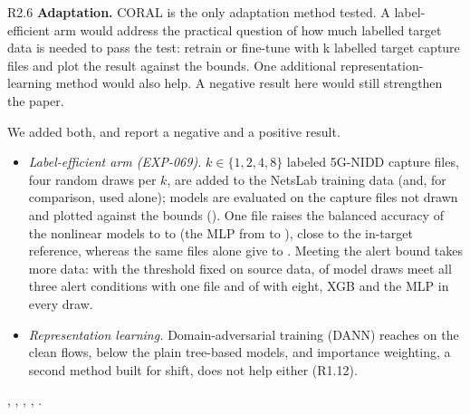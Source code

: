 \label{rv:R2.6}
\begin{concern}{R2.6}
\textbf{Adaptation.} CORAL is the only adaptation method tested. A label-efficient arm would address the practical question of how much labelled target data is needed to pass the test: retrain or fine-tune with k labelled target capture files and plot the result against the bounds. One additional representation-learning method would also help. A negative result here would still strengthen the paper.
\end{concern}
\response We added both, and report a negative and a positive result.
\begin{itemize}[leftmargin=*, itemsep=1pt]
\item \emph{Label-efficient arm (EXP-069).} $k \in \{1, 2, 4, 8\}$ labeled 5G-NIDD capture files, four random draws per $k$, are added to the NetsLab training data (and, for comparison, used alone); models are evaluated on the capture files not drawn and plotted against the bounds (). One file raises the balanced accuracy of the nonlinear models to \RLeSrcOneNlMin{} to \RLeSrcOneNlMax{} (the MLP from \RLeZeroMLP{} to \RLeSrcOneMLP), close to the in-target reference, whereas the same files alone give \RLeTgtOneNlMin{} to \RLeTgtOneNlMax. Meeting the alert bound takes more data: with the threshold fixed on source data, \RLeSrcOneMeet{} of \RLeSrcOneCells{} model draws meet all three alert conditions with one file and \RLeSrcEightMeet{} of \RLeSrcEightCells{} with eight, XGB and the MLP in every draw.
\item \emph{Representation learning.} Domain-adversarial training (DANN) reaches \RArmDannDANNClean{} on the clean flows, below the plain tree-based models, and importance weighting, a second method built for shift, does not help either (R1.12).
\end{itemize}

\action {}, , , , .
